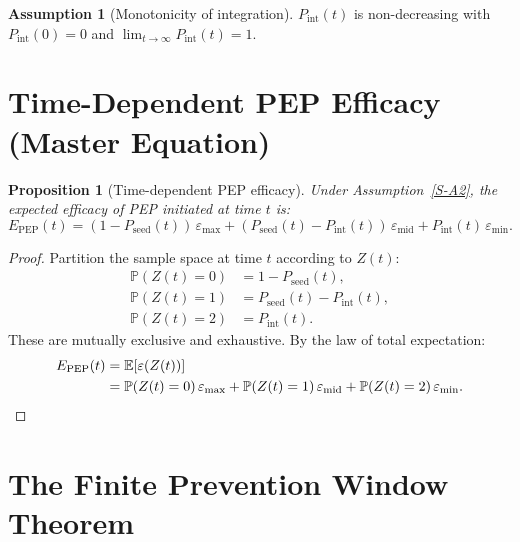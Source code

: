\documentclass[12pt,a4paper]{article}
\theoremstyle{plain}
\newtheorem{proposition}{Proposition}
\theoremstyle{definition}
\newtheorem{assumption}{Assumption}
\theoremstyle{remark}
\newcommand{\Pint}{P_{\mathrm{int}}}
\newcommand{\Pseed}{P_{\mathrm{seed}}}
\newcommand{\Epep}{E_{\mathrm{PEP}}}
\newcommand{\Prob}{\mathbb{P}}
\newcommand{\E}{\mathbb{E}}
\begin{document}
\begin{assumption}[Monotonicity of integration]\label{S-A3}
$\Pint(t)$ is non-decreasing with $\Pint(0) = 0$ and $\lim_{t \to \infty} \Pint(t) = 1$.
\end{assumption}


\section[Time-Dependent PEP Efficacy]{Time-Dependent PEP Efficacy (Master Equation)}\label{sec:S2}
\setcounter{theorem}{0}
\setcounter{proposition}{0}

\begin{proposition}[Time-dependent PEP efficacy]\label{prop:S-master}
Under Assumption~\ref{S-A2}, the expected efficacy of PEP initiated at time $t$ is:
\begin{equation}\label{eq:S-master}
    \Epep(t) = (1 - \Pseed(t))\,\varepsilon_{\max} + (\Pseed(t) - \Pint(t))\,\varepsilon_{\mathrm{mid}} + \Pint(t)\,\varepsilon_{\min}.
\end{equation}
\end{proposition}

\begin{proof}
Partition the sample space at time $t$ according to $Z(t)$:
\begin{align*}
    \Prob(Z(t) = 0) &= 1 - \Pseed(t), \\
    \Prob(Z(t) = 1) &= \Pseed(t) - \Pint(t), \\
    \Prob(Z(t) = 2) &= \Pint(t).
\end{align*}
These are mutually exclusive and exhaustive. By the law of total expectation:
\begin{align*}
    \Epep(t) &= \E[\varepsilon(Z(t))] \\
    &= \Prob(Z(t) = 0)\,\varepsilon_{\max} + \Prob(Z(t) = 1)\,\varepsilon_{\mathrm{mid}} + \Prob(Z(t) = 2)\,\varepsilon_{\min}. \qedhere
\end{align*}
\end{proof}


\section{The Finite Prevention Window Theorem}\label{sec:S3}
\setcounter{theorem}{0}
\end{document}
